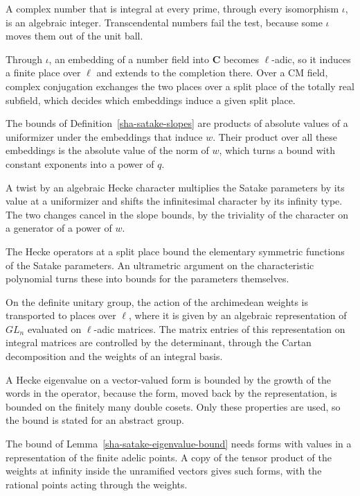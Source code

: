 A complex number that is integral at every prime, through every isomorphism $\iota$, is an algebraic integer. Transcendental numbers fail the test, because some $\iota$ moves them out of the unit ball.

Through $\iota$, an embedding of a number field into $\mathbf C$ becomes $\ell$-adic, so it induces a finite place over $\ell$ and extends to the completion there. Over a CM field, complex conjugation exchanges the two places over a split place of the totally real subfield, which decides which embeddings induce a given split place.

The bounds of Definition~\ref{sha-satake-slopes} are products of absolute values of a uniformizer under the embeddings that induce $w$. Their product over all these embeddings is the absolute value of the norm of $w$, which turns a bound with constant exponents into a power of $q$.

A twist by an algebraic Hecke character multiplies the Satake parameters by its value at a uniformizer and shifts the infinitesimal character by its infinity type. The two changes cancel in the slope bounds, by the triviality of the character on a generator of a power of $w$.

The Hecke operators at a split place bound the elementary symmetric functions of the Satake parameters. An ultrametric argument on the characteristic polynomial turns these into bounds for the parameters themselves.

On the definite unitary group, the action of the archimedean weights is transported to places over $\ell$, where it is given by an algebraic representation of $GL_n$ evaluated on $\ell$-adic matrices. The matrix entries of this representation on integral matrices are controlled by the determinant, through the Cartan decomposition and the weights of an integral basis.

A Hecke eigenvalue on a vector-valued form is bounded by the growth of the words in the operator, because the form, moved back by the representation, is bounded on the finitely many double cosets. Only these properties are used, so the bound is stated for an abstract group.

The bound of Lemma~\ref{sha-satake-eigenvalue-bound} needs forms with values in a representation of the finite adelic points. A copy of the tensor product of the weights at infinity inside the unramified vectors gives such forms, with the rational points acting through the weights.

